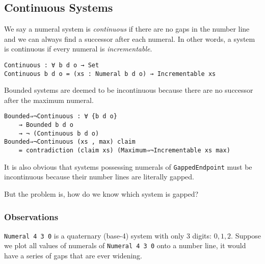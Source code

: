 \documentclass[\main/thesis.tex]{subfiles}
\begin{document}
\subsection{Continuous Systems}\label{continuous}

We say a numeral system is \textit{continuous} if there are no gaps in the number
line and we can always find a successor after each numeral.
In other words, a system is continuous if every numeral is \textit{incrementable}.

\begin{lstlisting}
Continuous : ∀ b d o → Set
Continuous b d o = (xs : Numeral b d o) → Incrementable xs
\end{lstlisting}

Bounded systems are deemed to be incontinuous because there are no successor
after the maximum numeral.

\begin{lstlisting}
Bounded⇒¬Continuous : ∀ {b d o}
    → Bounded b d o
    → ¬ (Continuous b d o)
Bounded⇒¬Continuous (xs , max) claim
    = contradiction (claim xs) (Maximum⇒¬Incrementable xs max)
\end{lstlisting}

It is also obvious that systems possessing numerals of \lstinline|GappedEndpoint|
must be incontinuous because their number lines are literally gapped.






But the problem is, how do we know which system is gapped?

\subsubsection{Observations}

\lstinline|Numeral 4 3 0| is a quaternary (base-4) system with only 3 digits:
$0, 1, 2$.
Suppose we plot all values of numerals of \lstinline|Numeral 4 3 0| onto a number
line, it would have a series of gaps that are ever widening.
\end{document}
